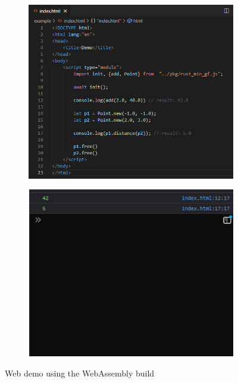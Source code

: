 \begin{figure}
  \centering
  \begin{subfigure}{0.45\linewidth}
    \includegraphics[width=\linewidth]{9.PNG}
    \centering
  \end{subfigure}%
  \qquad
  \begin{subfigure}{0.45\linewidth}
    \includegraphics[width=\linewidth]{result.png}
    \centering
  \end{subfigure}%
\caption{Web demo using the WebAssembly build}
\label{fig:min-rust:demo}
\end{figure}

